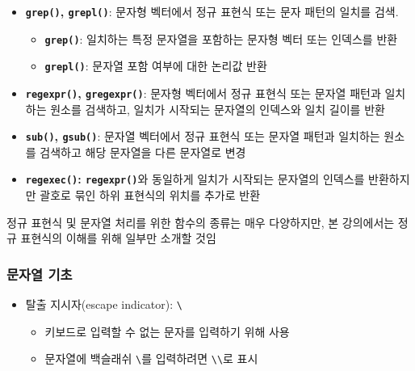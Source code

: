 \documentclass[
  11pt,
]{krantz}
\makeatletter
\providecommand{\tightlist}{%
  \setlength{\itemsep}{0pt}\setlength{\parskip}{0pt}}
\newenvironment{kframe}{%
\medskip{}
\setlength{\fboxsep}{.8em}
 \def\at@end@of@kframe{}%
 \ifinner\ifhmode%
  \def\at@end@of@kframe{\end{minipage}}%
  \begin{minipage}{\columnwidth}%
 \fi\fi%
 \def\FrameCommand##1{\hskip\@totalleftmargin \hskip-\fboxsep
 \colorbox{shadecolor}{##1}\hskip-\fboxsep
     \hskip-\linewidth \hskip-\@totalleftmargin \hskip\columnwidth}%
 \MakeFramed {\advance\hsize-\width
   \@totalleftmargin\z@ \linewidth\hsize
   \@setminipage}}%
 {\par\unskip\endMakeFramed%
 \at@end@of@kframe}
\newenvironment{rmdblock}[1]
  {
  \begin{itemize}
  \renewcommand{\labelitemi}{
    \raisebox{-.7\height}[0pt][0pt]{
      {\setkeys{Gin}{width=3em,keepaspectratio}\texttt{[image: images/\#1]}}
    }
  }
  \setlength{\fboxsep}{1em}
  \begin{kframe}
  \item
  }
  {
  \end{kframe}
  \end{itemize}
  }
\newenvironment{rmdnote}
  {\begin{rmdblock}{note}}
  {\end{rmdblock}}
\renewenvironment{quote}{\begin{kframe}}{\end{kframe}}
\makeatother
\begin{document}
\begin{quote}
\begin{itemize}
\item
  \textbf{\texttt{grep()}, \texttt{grepl()}}: 문자형 벡터에서 정규 표현식 또는 문자 패턴의 일치를 검색.

  \begin{itemize}
  \tightlist
  \item
    \textbf{\texttt{grep()}}: 일치하는 특정 문자열을 포함하는 문자형 벡터 또는 인덱스를 반환
  \item
    \textbf{\texttt{grepl()}}: 문자열 포함 여부에 대한 논리값 반환\\
  \end{itemize}
\item
  \textbf{\texttt{regexpr()}, \texttt{gregexpr()}}: 문자형 벡터에서 정규 표현식 또는 문자열 패턴과 일치하는 원소를 검색하고, 일치가 시작되는 문자열의 인덱스와 일치 길이를 반환
\item
  \textbf{\texttt{sub()}, \texttt{gsub()}}: 문자열 벡터에서 정규 표현식 또는 문자열 패턴과 일치하는 원소를 검색하고 해당 문자열을 다른 문자열로 변경
\item
  \textbf{\texttt{regexec()}: \texttt{regexpr()}}와 동일하게 일치가 시작되는 문자열의 인덱스를 반환하지만 괄호로 묶인 하위 표현식의 위치를 추가로 반환
\end{itemize}
\end{quote}

\footnotesize

\begin{rmdnote}
정규 표현식 및 문자열 처리를 위한 함수의 종류는 매우 다양하지만, 본 강의에서는 정규 표현식의 이해를 위해 일부만 소개할 것임
\end{rmdnote}

\normalsize

\hypertarget{string-basic}{%
\subsubsection*{\texorpdfstring{\textbf{문자열 기초}}{문자열 기초}}\label{string-basic}}


\begin{itemize}
\tightlist
\item
  탈출 지시자(escape indicator): \texttt{\textbackslash{}}

  \begin{itemize}
  \tightlist
  \item
    키보드로 입력할 수 없는 문자를 입력하기 위해 사용
  \item
    문자열에 백슬래쉬 \texttt{\textbackslash{}}를 입력하려면 \texttt{\textbackslash{}\textbackslash{}}로 표시
  \end{itemize}
\end{itemize}
\end{document}
